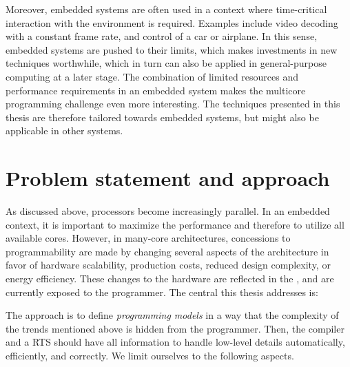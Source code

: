 Moreover, embedded systems are often used in a context where time-critical interaction with the environment is required.
Examples include video decoding with a constant frame rate, and control of a car or airplane.
In this sense, embedded systems are pushed to their limits, which makes investments in new techniques worthwhile, which in turn can also be applied in general-purpose computing at a later stage.
The combination of limited resources and performance requirements in an embedded system makes the multicore programming challenge even more interesting.
The techniques presented in this thesis are therefore tailored towards embedded systems, but might also be applicable in other systems.


\section{Problem statement and approach}
\label{s:intro:problem}

As discussed above, processors become increasingly parallel.
In an embedded context, it is important to maximize the performance and therefore to utilize all available cores.
However, in many-core architectures, concessions to programmability are made by changing several aspects of the architecture in favor of hardware scalability, production costs, reduced design complexity, or energy efficiency.
These changes to the hardware are reflected in the , and are currently exposed to the programmer.
The central  this thesis addresses is:
\chapdef{}%
\begin{emphasize}
	\theproblem
\end{emphasize}

The approach is to define \emph{programming models} in a way that the complexity of the trends mentioned above is hidden from the programmer.
Then, the compiler and a \acl{RTS} should have all information to handle low-level details automatically, efficiently, and correctly.
We limit ourselves to the following aspects.


